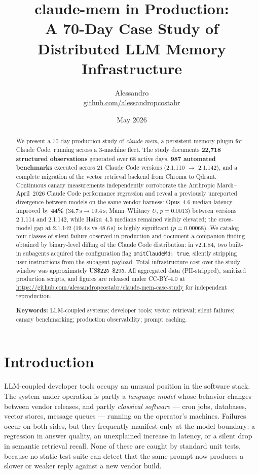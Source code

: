 \documentclass[11pt,a4paper]{article}
\title{\textbf{claude-mem in Production:\\
A 70-Day Case Study of Distributed LLM Memory Infrastructure}}
\author{Alessandro\\
\small\href{https://github.com/alessandropcostabr}{github.com/alessandropcostabr}}
\date{May 2026}
\begin{document}
\maketitle

\begin{abstract}
\noindent We present a 70-day production study of \emph{claude-mem}, a persistent
memory plugin for Claude Code, running across a 3-machine fleet. The study
documents \textbf{22{,}718 structured observations} generated over 68 active days,
\textbf{987 automated benchmarks} executed across 21 Claude Code versions
(2.1.110 $\to$ 2.1.142), and a complete migration of the vector retrieval
backend from Chroma to Qdrant. Continuous canary measurements independently
corroborate the Anthropic March--April~2026 Claude Code performance regression
and reveal a previously unreported divergence between models on the same vendor
harness: Opus~4.6 median latency improved by \textbf{44\%}
($34.7\,\mathrm{s} \to 19.4\,\mathrm{s}$; Mann--Whitney
$U$, $p = 0.0013$) between versions 2.1.114 and 2.1.142, while Haiku~4.5
medians remained visibly elevated; the cross-model gap at 2.1.142
($19.4\,\mathrm{s}$ vs $48.6\,\mathrm{s}$) is highly significant
($p = 0.00068$). We catalog four classes of silent failure observed in production
and document a companion finding obtained by binary-level diffing of the Claude
Code distribution: in v2.1.84, two built-in subagents acquired the configuration
flag \texttt{omitClaudeMd:\,true}, silently stripping user instructions from
the subagent payload. Total infrastructure cost over the study window was
approximately \mbox{US\$225--\$295}. All aggregated data (PII-stripped), sanitized
production scripts, and figures are released under CC-BY-4.0 at
\url{https://github.com/alessandropcostabr/claude-mem-case-study} for independent
reproduction.

\medskip
\noindent\textbf{Keywords:} LLM-coupled systems; developer tools; vector
retrieval; silent failures; canary benchmarking; production observability;
prompt caching.
\end{abstract}

\section{Introduction}

LLM-coupled developer tools occupy an unusual position in the software stack.
The system under operation is partly a \emph{language model} whose behavior
changes between vendor releases, and partly \emph{classical software} ---
cron jobs, databases, vector stores, message queues --- running on the operator's
machines. Failures occur on both sides, but they frequently manifest only at the
model boundary: a regression in answer quality, an unexplained increase in
latency, or a silent drop in semantic retrieval recall. None of these are caught
by standard unit tests, because no static test suite can detect that the same
prompt now produces a slower or weaker reply against a new vendor build.
\end{document}
